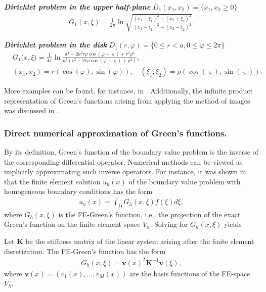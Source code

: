 \textit{\textbf{Dirichlet problem in the upper half-plane}} $D_1(x_1,x_2)=\{x_1,x_2\geq0\}$
\begin{align*}
	G_1(x,\xi) = \frac{1}{2 \pi} \ln \sqrt{ \frac{ (x_1-\xi_1)^2 + (x_2+\xi_2)^2 }{ (x_1-\xi_1)^2 + (x_2-\xi_2)^2 } }.
\end{align*}


\textit{\textbf{Dirichlet problem in the disk}} $D_1(r,\varphi)=\{0 \leq r < a, 0 \leq \varphi \leq 2 \pi \}$
\begin{align*}
	&G_1 \big( x, \xi \big) = \frac{1}{4 \pi} \ln \frac{a^4 - 2a^2r\rho  \cos(\varphi- \varsigma)+r^2 \rho^2}{a^2(r^2-2r\rho \cos(\varphi- \varsigma)+\rho^2)},
	\quad
	\\[1em]
	&(x_1,x_2) = r ( \cos(\varphi), \sin(\varphi) ),
	\quad
	(\xi_1,\xi_2) = \rho ( \cos(\varsigma), \sin(\varsigma) ).
\end{align*}

More examples can be found, for instance, in \cite{Duffy2001,Melnikov2011}.
Additionally, the infinite product representation of Green's functions arising from applying the method of images was discussed in \cite{Melnikov2012,Reshniak2013}.


\subsubsection{Direct numerical approximation of Green's functions.}


By its definition, Green's function of the boundary value problem is the inverse of the corresponding differential operator.
Numerical methods can be viewed as implicitly approximating such inverse operators.
For instance, it was shown in \cite{Tottenham1970} that the finite element solution $u_h(x)$ of the boundary value problem with homogeneous boundary conditions has the form
\begin{align*}
	u_h(x) = \int_D G_h(x,\xi) f(\xi) d \xi,
\end{align*}
where $G_h(x,\xi)$ is the FE-Green's function, i.e., the projection of the exact Green's function on the finite element space $V_h$.
Solving for $G_h(x,\xi)$ yields

\begin{Theorem} 
Let $\mathbf K$ be the stiffness matrix of the linear system arising after the finite element disretization.
The FE-Green's function has the form
\begin{align} \label{eq:FE_GF}
	G_h(x,\xi) = \mathbf{v}(x)^T \mathbf K^{-1} \mathbf{v}(\xi),
\end{align}
where $\mathbf{v}(x)=(v_1(x),...,v_M(x))$ are the basis functions of the FE-space $V_h$.
\end{Theorem}

